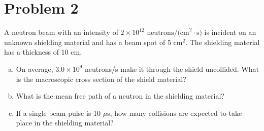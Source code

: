 \section*{Problem 2}

A neutron beam with an intensity of $2 \times 10^{12}\text{ neutrons/(cm}^2{\cdot}\text{s)}$ is incident on an unknown shielding material and has a beam spot of 5 cm$^2$. The shielding material has a thickness of 10 cm.
\begin{enumerate}[a)]
\item On average, $3.0\times10^9$ neutrons/s make it through the shield uncollided. What is the macroscopic cross section of the shield material?
\item What is the mean free path of a neutron in the shielding material?
\item If a single beam pulse is 10 $\mu$s, how many collisions are expected to take place in the shielding material?
\end{enumerate}


